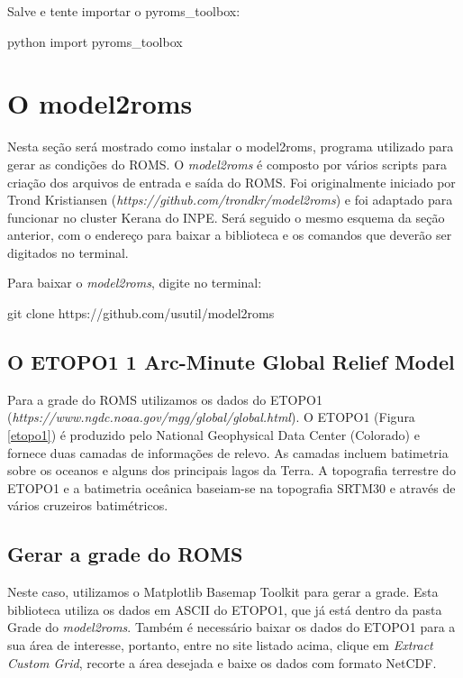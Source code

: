 \noindent Salve e tente importar o pyroms\_toolbox:
\bigskip

\begin{bashcode}
python
import pyroms_toolbox
\end{bashcode}
\bigskip

\section{O model2roms}

\noindent Nesta seção será mostrado como instalar o model2roms, programa utilizado para gerar as condições do ROMS. O \textit{model2roms} é composto por vários scripts para criação dos arquivos de entrada e saída do ROMS. Foi originalmente iniciado por Trond Kristiansen (\textcolor{bleu_cite}{\textit{https://github.com/trondkr/model2roms}}) e foi adaptado para funcionar no cluster Kerana do INPE. Será seguido o mesmo esquema da seção anterior, com o endereço para baixar a biblioteca e os comandos que deverão ser digitados no terminal.
\bigskip

\noindent Para baixar o \textit{model2roms}, digite no terminal:
\bigskip

\begin{bashcode}
git clone https://github.com/usutil/model2roms
\end{bashcode}
\bigskip

\subsection{O ETOPO1 1 Arc-Minute Global Relief Model}

\noindent Para a grade do ROMS utilizamos os dados do ETOPO1 (\textcolor{bleu_cite}{\textit{https://www.ngdc.noaa.gov/mgg/global/global.html}}). O ETOPO1 (Figura \ref{etopo1}) é produzido pelo National Geophysical Data Center (Colorado) e fornece duas camadas de informações de relevo. As camadas incluem batimetria sobre os oceanos e alguns dos principais lagos da Terra. A topografia terrestre do ETOPO1 e a batimetria oceânica baseiam-se na topografia SRTM30 e através de vários cruzeiros batimétricos.
\bigskip

\subsection{Gerar a grade do ROMS}
\bigskip

\noindent Neste caso, utilizamos o  Matplotlib Basemap Toolkit para gerar a grade. Esta biblioteca utiliza os dados em ASCII do ETOPO1, que já está dentro da pasta Grade do \textit{model2roms}. Também é necessário baixar os dados do ETOPO1 para a sua área de interesse, portanto, entre no site listado acima, clique em \textit{Extract Custom Grid}, recorte a área desejada e baixe os dados com formato NetCDF.
\bigskip


